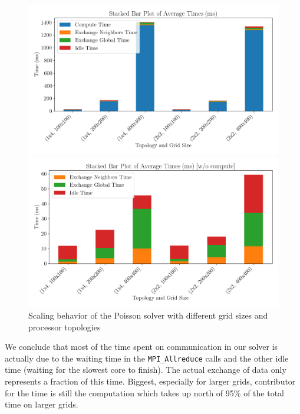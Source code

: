 \begin{figure}[H]
    \centering
    \begin{minipage}{0.48\textwidth}
        \centering
        \includegraphics[width=\linewidth]{../fig/lab2/average_times_stacked_bar_22.png}
    \end{minipage}%
    \hspace{0.02\textwidth}
    \begin{minipage}{0.48\textwidth}
        \centering
        \includegraphics[width=\linewidth]{../fig/lab2/average_times_stacked_bar_no_comp_22.png}
    \end{minipage}
    \caption{Scaling behavior of the Poisson solver with different grid sizes and processor topologies}
    \label{fig:timingbar}
\end{figure}
We conclude that most of the time spent on communication in our solver is actually due to the waiting time in the \texttt{MPI\_Allreduce} calls and the other idle time (waiting for the slowest core to finish). The actual exchange of data only represents a fraction of this time. Biggest, especially for larger grids, contributor for the time is still the computation which takes up north of 95\% of the total time on larger grids.\\
